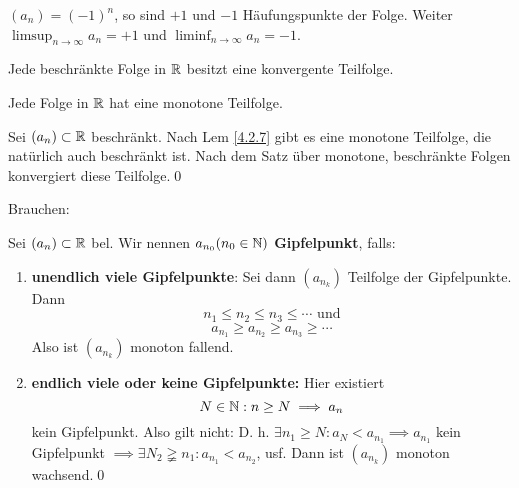 \begin{subexample}
	$ (a_n) = (-1)^n $, so sind $ +1 $ und $ -1 $ Häufungspunkte der Folge. Weiter $ \limsup_{n\to\infty} a_n = +1 $ und $ \liminf_{n\to\infty} a_n = -1 $.\\
\end{subexample}

\begin{subtheorem}
	Jede beschränkte Folge in $ \mathbb{R} $ besitzt eine konvergente Teilfolge.
\end{subtheorem}
\begin{sublemma}
	Jede Folge in $\mathbb{R}$ hat eine monotone Teilfolge.
\end{sublemma}
\begin{subproof*}
	Sei $ (a_n) \subset \mathbb{R} $ beschränkt. Nach Lem \ref{4.2.7} gibt es eine monotone Teilfolge, die natürlich auch beschränkt ist. Nach dem Satz über monotone, beschränkte Folgen konvergiert diese Teilfolge.\qed
\end{subproof*}
Brauchen:
\begin{subproof*}
	Sei $ (a_n) \subset \mathbb{R} $ bel. Wir nennen $ a_{n_0} (n_0 \in \mathbb{N})$ \textbf{Gipfelpunkt}, falls:
	\begin{enumerate}[label=(\roman*)]
		\item \textbf{unendlich viele Gipfelpunkte}: Sei dann $ (a_{n_k}) $ Teilfolge der Gipfelpunkte.
			Dann \[ n_1 \leq n_2 \leq n_3 \leq \dotsb \text{ und} \]
			\[ a_{n_1} \geq a_{n_2} \geq a_{n_3} \geq \dotsb \]
			Also ist $ (a_{n_k}) $ monoton fallend.
		\item \textbf{endlich viele oder keine Gipfelpunkte:} Hier existiert
			\[ N \in \mathbb{N} : n \geq N \implies a_n \] kein Gipfelpunkt. Also gilt nicht:
			D. h. $ \exists n_1 \geq N: a_N < a_{n_1} \implies a_{n_1} $ kein Gipfelpunkt $\implies \exists N_2 \gneqq n_1 : a_{n_1} < a_{n_2}$, usf. Dann ist $ (a_{n_k} ) $ monoton wachsend.\qed
	\end{enumerate}
\end{subproof*}


